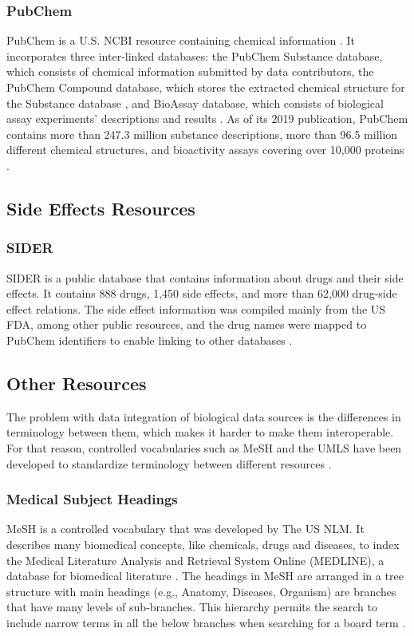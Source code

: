 \subsubsection{PubChem}
PubChem is a U.S. \ac{NCBI} resource containing chemical information \cite{kim_pubchem_2019}. It incorporates three inter-linked databases: the PubChem Substance database, which consists of chemical information submitted by data contributors, the PubChem Compound database, which stores the extracted chemical structure for the Substance database \cite{kim_pubchem_2016}, and BioAssay database, which consists of biological assay experiments’ descriptions and results \cite{kim_pubchem_2019}. As of its 2019 publication, PubChem contains more than 247.3 million substance descriptions, more than 96.5 million different chemical structures, and bioactivity assays covering over 10,000 proteins \cite{kim_pubchem_2019}.

\subsection{Side Effects Resources}
\subsubsection{SIDER}
\ac{SIDER} is a public database that contains information about drugs and their side effects. It contains 888 drugs, 1,450 side effects, and more than 62,000 drug-side effect relations. The side effect information was compiled mainly from the US \ac{FDA}, among other public resources, and the drug names were mapped to PubChem identifiers to enable linking to other databases \cite{kuhn_side_2010}.

\subsection{Other Resources}
The problem with data integration of biological data sources is the differences in terminology between them, which makes it harder to make them interoperable. For that reason, controlled vocabularies such as \ac{MeSH} and the \ac{UMLS} have been developed to standardize terminology between different resources \cite{bodenreider_unified_2004}.

\subsubsection{Medical Subject Headings}
\ac{MeSH} is a controlled vocabulary that was developed by The US \ac{NLM}. It describes many biomedical concepts, like chemicals, drugs and diseases, to index the Medical Literature Analysis and Retrieval System Online (MEDLINE), a database for biomedical literature \cite{huang_recommending_2011}. The headings in \ac{MeSH} are arranged in a tree structure with main headings (e.g., Anatomy, Diseases, Organism) are branches that have many levels of sub-branches. This hierarchy permits the search to include narrow terms in all the below branches when searching for a board term \cite{noauthor_introduction_nodate}.

